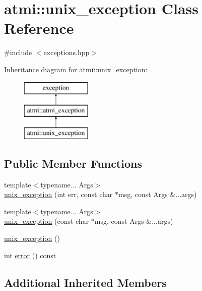 \hypertarget{classatmi_1_1unix__exception}{}\section{atmi\+:\+:unix\+\_\+exception Class Reference}
\label{classatmi_1_1unix__exception}


{\ttfamily \#include $<$exceptions.\+hpp$>$}

Inheritance diagram for atmi\+:\+:unix\+\_\+exception\+:\begin{figure}[H]
\begin{center}
\leavevmode
\includegraphics[height=3.000000cm]{classatmi_1_1unix__exception}
\end{center}
\end{figure}
\subsection*{Public Member Functions}
\begin{DoxyCompactItemize}
\item 
{\footnotesize template$<$typename... Args$>$ }\\\hyperlink{classatmi_1_1unix__exception_a0e296d42c4d9e4008e0f3b920fe453ae}{unix\+\_\+exception} (int err, const char $\ast$msg, const Args \&...args)
\item 
{\footnotesize template$<$typename... Args$>$ }\\\hyperlink{classatmi_1_1unix__exception_aec5e09afab40d70b2b4d9aa314a5b71b}{unix\+\_\+exception} (const char $\ast$msg, const Args \&...args)
\item 
\hyperlink{classatmi_1_1unix__exception_aeba0ddfd609e50f3bdf03b7208fdcc3d}{unix\+\_\+exception} ()
\item 
int \hyperlink{classatmi_1_1unix__exception_a4aab55cca505c04ea9e1c65b8cc0c254}{error} () const 
\end{DoxyCompactItemize}
\subsection*{Additional Inherited Members}


